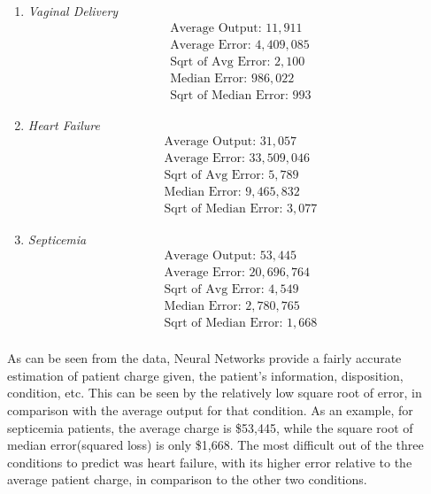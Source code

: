 \documentclass[letterpaper,11pt]{article}
\begin{document}
\begin{enumerate}
\item \textit{Vaginal Delivery}\\
\begin{align*}
\textrm{Average Output: } 11,911\\
\textrm{Average Error: } 4,409,085\\
\textrm{Sqrt of Avg Error: } 2,100\\
\textrm{Median Error: } 986,022\\
\textrm{Sqrt of Median Error: } 993
\end{align*}

\item \textit{Heart Failure}\\
\begin{align*}
\textrm{Average Output: } 31,057\\
\textrm{Average Error: } 33,509,046\\
\textrm{Sqrt of Avg Error: } 5,789\\
\textrm{Median Error: } 9,465,832\\
\textrm{Sqrt of Median Error: } 3,077
\end{align*}

\item \textit{Septicemia}\\
\begin{align*}
\textrm{Average Output: } 53,445\\
\textrm{Average Error: } 20,696,764\\
\textrm{Sqrt of Avg Error: } 4,549\\
\textrm{Median Error: } 2,780,765\\
\textrm{Sqrt of Median Error: } 1,668\\
\end{align*}
\end{enumerate}

As can be seen from the data, Neural Networks provide a fairly accurate estimation of patient charge given, the patient's information, disposition, condition, etc. This can be seen by the relatively low square root of error, in comparison with the average output for that condition. As an example, for septicemia patients, the average charge is \$53,445, while the square root of median error(squared loss) is only \$1,668. The most difficult out of the three conditions to predict was heart failure, with its higher error relative to the average patient charge, in comparison to the other two conditions.
\end{document}
